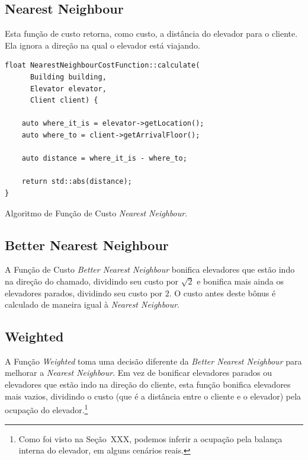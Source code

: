 
\subsection{\label{model:costfunctions:nn}Nearest Neighbour}
Esta função de custo retorna, como custo, a distância do
elevador para o cliente. Ela ignora a direção na qual o elevador está viajando.

\begin{algorithm}[htb!]
  \centering
  \begin{verbatim}
float NearestNeighbourCostFunction::calculate(
      Building building,
      Elevator elevator,
      Client client) {

    auto where_it_is = elevator->getLocation();
    auto where_to = client->getArrivalFloor();

    auto distance = where_it_is - where_to;

    return std::abs(distance);
}
  \end{verbatim}
  \caption{\label{alg:nn_cf}Algoritmo de Função de Custo \textit{Nearest Neighbour}.}
\end{algorithm}


\subsection{\label{model:costfunctions:bnn}Better Nearest Neighbour}
A Função de Custo \textit{Better Nearest Neighbour} bonifica elevadores que
estão indo na direção do chamado, dividindo seu custo por $\sqrt 2$ e bonifica
mais ainda os elevadores parados, dividindo seu custo por $2$. O custo antes
deste bônus é calculado de maneira igual à \textit{Nearest Neighbour}.


\subsection{\label{model:costfunctions:weighted}Weighted}
A Função \textit{Weighted} toma uma decisão diferente da \textit{Better Nearest
  Neighbour} para melhorar a \textit{Nearest Neighbour}. Em vez de bonificar
elevadores parados ou elevadores que estão indo na direção do cliente, esta
função bonifica elevadores mais vazios, dividindo o custo (que é a distância
entre o cliente e o elevador) pela ocupação do elevador.\footnote{Como foi visto
na Seção~XXX, podemos inferir a ocupação pela balança interna do elevador, em
alguns cenários reais.}

